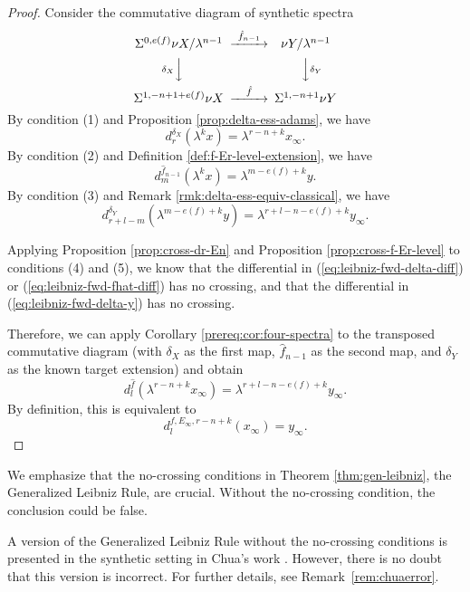 \begin{proof}
    Consider the commutative diagram of synthetic spectra
    $$\begin{CD}
        \Sus^{0,e(f)}\nu X/\lambda^{n-1} @>{\hat f_{n-1}}>> \nu Y/\lambda^{n-1} \\
        @V{\delta_X}VV @VV{\delta_Y}V \\
        \Sus^{1,-n+1+e(f)} \nu X @>{\hat f}>> \Sus^{1,-n+1}\nu Y
    \end{CD}$$
    By condition (1) and Proposition \ref{prop:delta-ess-adams}, we have
    \begin{equation}\label{eq:leibniz-fwd-delta-diff}
        d^{\delta_X}_r(\lambda^k x)=\lambda^{r-n+k}x_\infty.
    \end{equation}
    By condition (2) and Definition \ref{def:f-Er-level-extension}, we have
    \begin{equation}\label{eq:leibniz-fwd-fhat-diff}
        d^{\hat f_{n-1}}_m(\lambda^k x)=\lambda^{m-e(f)+k} y.
    \end{equation}
    By condition (3) and Remark \ref{rmk:delta-ess-equiv-classical}, we have
    \begin{equation}\label{eq:leibniz-fwd-delta-y}
        d^{\delta_Y}_{r+l-m}(\lambda^{m-e(f)+k} y)=\lambda^{r+l-n-e(f)+k} y_\infty.
    \end{equation}

    Applying Proposition \ref{prop:cross-dr-En} and Proposition \ref{prop:cross-f-Er-level} to conditions (4) and (5), we know that the differential in (\ref{eq:leibniz-fwd-delta-diff}) or (\ref{eq:leibniz-fwd-fhat-diff}) has no crossing, and that the differential in (\ref{eq:leibniz-fwd-delta-y}) has no crossing.

    Therefore, we can apply Corollary \ref{prereq:cor:four-spectra} to the transposed commutative diagram (with $\delta_X$ as the first map, $\hat f_{n-1}$ as the second map, and $\delta_Y$ as the known target extension) and obtain
    $$d^{\hat f}_l(\lambda^{r-n+k}x_\infty)=\lambda^{r+l-n-e(f)+k}y_\infty.$$
    By definition, this is equivalent to
    $$d_{l}^{f,E_\infty, r-n+k}(x_\infty)=y_\infty.$$
\end{proof}

We emphasize that the no-crossing conditions in Theorem \ref{thm:gen-leibniz}, the Generalized Leibniz Rule, are crucial. Without the no-crossing condition, the conclusion could be false.

\begin{remark}
    A version of the Generalized Leibniz Rule without the no-crossing conditions is presented in the synthetic setting in Chua's work \cite[Theorem~12.9]{Chua}. However, there is no doubt that this version is incorrect. For further details, see Remark~\ref{rem:chuaerror}.
\end{remark}

